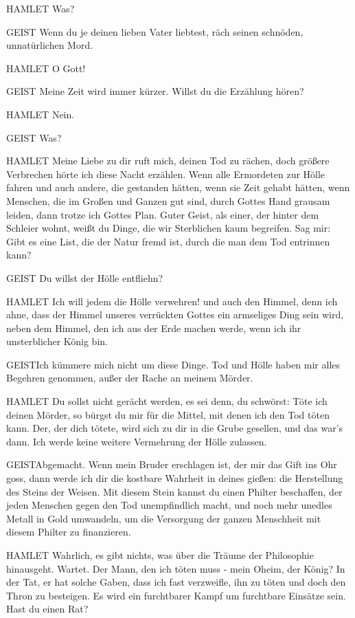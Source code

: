 HAMLET Was?

GEIST Wenn du je deinen lieben Vater liebtest, räch seinen schnöden,
unnatürlichen Mord.

HAMLET O Gott!

GEIST Meine Zeit wird immer kürzer. Willst du die Erzählung hören?

HAMLET Nein.

GEIST Was?

HAMLET Meine Liebe zu dir ruft mich, deinen Tod zu rächen, doch größere
Verbrechen hörte ich diese Nacht erzählen. Wenn alle Ermordeten zur Hölle fahren
und auch andere, die gestanden hätten, wenn sie Zeit gehabt hätten, wenn
Menschen, die im Großen und Ganzen gut sind, durch Gottes Hand grausam leiden,
dann trotze ich Gottes Plan. Guter Geist, als einer, der hinter dem Schleier
wohnt, weißt du Dinge, die wir Sterblichen kaum begreifen. Sag mir: Gibt es eine
List, die der Natur fremd ist, durch die man dem Tod entrinnen kann?

GEIST Du willst der Hölle entfliehn?

HAMLET Ich will jedem die Hölle verwehren! und auch den Himmel, denn ich ahne,
dass der Himmel unseres verrückten Gottes ein armseliges Ding sein wird, neben
dem Himmel, den ich aus der Erde machen werde, wenn ich ihr unsterblicher König
bin.

GEISTIch kümmere mich nicht um diese Dinge. Tod und Hölle haben mir alles
Begehren genommen, außer der Rache an meinem Mörder.

HAMLET Du sollst nicht gerächt werden, es sei denn, du schwörst: Töte ich deinen
Mörder, so bürgst du mir für die Mittel, mit denen ich den Tod töten kann. Der,
der dich tötete, wird sich zu dir in die Grube gesellen, und das war's dann. Ich
werde keine weitere Vermehrung der Hölle zulassen.

GEISTAbgemacht. Wenn mein Bruder erschlagen ist, der mir das Gift ins Ohr goss,
dann werde ich dir die kostbare Wahrheit in deines gießen: die Herstellung des
Steins der Weisen. Mit diesem Stein kannst du einen Philter beschaffen, der
jeden Menschen gegen den Tod unempfindlich macht, und noch mehr unedles Metall
in Gold umwandeln, um die Versorgung der ganzen Menschheit mit diesem Philter zu
finanzieren.

HAMLET Wahrlich, es gibt nichts, was über die Träume der Philosophie hinausgeht.
Wartet. Der Mann, den ich töten muss - mein Oheim, der König? In der Tat, er hat
solche Gaben, dass ich fast verzweifle, ihn zu töten und doch den Thron zu
besteigen. Es wird ein furchtbarer Kampf um furchtbare Einsätze sein. Hast du
einen Rat?

